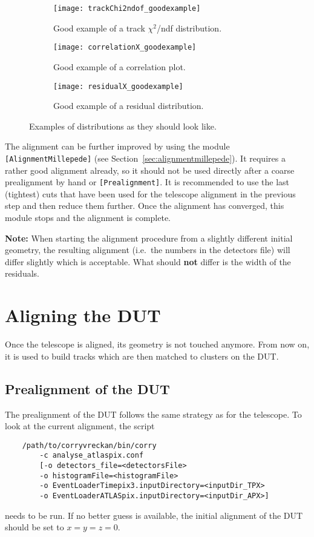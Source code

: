 \begin{figure}
    \centering
    \begin{subfigure}[t]{0.66\textwidth}
        \texttt{[image: trackChi2ndof\_goodexample]}
        \caption{Good example of a track $\chi^2$/ndf distribution.}
        \label{fig:trackChi2}
    \end{subfigure}
    \begin{subfigure}[t]{0.66\textwidth}
        \texttt{[image: correlationX\_goodexample]}
        \caption{Good example of a correlation plot.}
        \label{fig:correlationX}
    \end{subfigure}
    \begin{subfigure}[t]{0.66\textwidth}
        \texttt{[image: residualX\_goodexample]}
        \caption{Good example of a residual distribution.}
        \label{fig:residualX}
    \end{subfigure}
    \caption{Examples of distributions as they should look like.}
    \label{fig:exampleAlignment}
\end{figure}

The alignment can be further improved by using the module \texttt{[AlignmentMillepede]} (see Section~\ref{sec:alignmentmillepede}).
It requires a rather good alignment already, so it should not be used directly after a coarse prealignment by hand or \texttt{[Prealignment]}.
It is recommended to use the last (tightest) cuts that have been used for the telescope alignment in the previous step and then reduce them further.
Once the alignment has converged, this module stops and the alignment is complete.

\textbf{Note:} When starting the alignment procedure from a slightly different initial geometry, the resulting alignment (i.e.~the numbers in the detectors file) will differ slightly which is acceptable. What should \textbf{not} differ is the width of the residuals.

\section{Aligning the DUT}
\label{sec:align_dut}
Once the telescope is aligned, its geometry is not touched anymore. From now on, it is used to build tracks which are then matched to clusters on the DUT.

\subsection*{Prealignment of the DUT}
The prealignment of the DUT follows the same strategy as for the telescope. To look at the current alignment, the script
\begin{verbatim}
    /path/to/corryvreckan/bin/corry 
    	-c analyse_atlaspix.conf 
    	[-o detectors_file=<detectorsFile> 
    	-o histogramFile=<histogramFile> 
    	-o EventLoaderTimepix3.inputDirectory=<inputDir_TPX>
    	-o EventLoaderATLASpix.inputDirectory=<inputDir_APX>]
\end{verbatim}
needs to be run.
If no better guess is available, the initial alignment of the DUT should be set to $x=y=z=0$.

